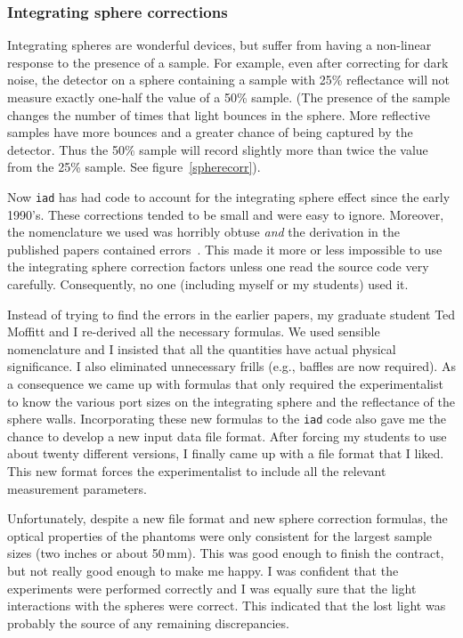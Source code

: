 \documentclass{article}
\newcommand\iadprog{\texttt{iad}}
\begin{document}
\subsubsection*{Integrating sphere corrections}

Integrating spheres are wonderful devices, but 
suffer from having a non-linear response to the presence of a sample.  For 
example, even after correcting for dark noise, the detector on a sphere 
containing a sample with 25\% reflectance will not measure exactly one-half 
the value of a 50\% sample. (The presence of the sample changes the number
of times that light bounces in the sphere.  More reflective samples have
more bounces and a greater chance of being captured by the detector.  Thus
the 50\% sample will record slightly more than twice the value from the
25\% sample.  See figure~\ref{spherecorr}).

Now \iadprog{} has had code to account for the integrating sphere effect since
the early 1990's.  These
corrections tended to be small and were easy to ignore.  Moreover,
the nomenclature we used was horribly obtuse \textit{and} the derivation in the published
papers contained errors~\cite{pickering93a}.  This made it more or less impossible
to use the integrating sphere correction factors unless one read the source
code very carefully.  Consequently, no one (including myself or my students)
used it.  

Instead of trying to find the errors in the earlier papers, my graduate
student Ted Moffitt and I re-derived all the necessary formulas.  We used
sensible nomenclature and I insisted that all the quantities have actual
physical significance.  I also eliminated unnecessary frills (e.g., baffles
are now required).  As a consequence we came up with formulas that 
only required the experimentalist to know the various port sizes on the
integrating sphere and the reflectance of the sphere walls.  
Incorporating these new formulas to the \iadprog{} code also gave me the chance
to develop a new input data file format.  After forcing my students to use about 
twenty different versions,
I finally came up with a file format that I liked.  This new format forces
the experimentalist to include all the relevant measurement parameters.  

Unfortunately, despite a new file format and new sphere correction formulas,
the optical properties of the phantoms were only consistent for the largest
sample sizes (two inches or about 50\,mm).  This was good enough to finish
the contract, but not really good enough to make me happy.  I was confident
that the experiments were performed correctly and I was equally sure that
the light interactions with the spheres were correct.  This indicated that the
lost light was probably the source of any remaining discrepancies.
\end{document}
